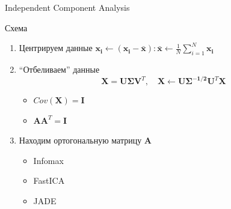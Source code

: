 \documentclass[10pt]{beamer}
\begin{document}
\begin{frame}{Independent Component Analysis}
\begin{block}{Схема}
    \begin{enumerate}
        \item Центрируем данные $\mathbf{x_i} \leftarrow (\mathbf{x_i} -
            \mathbf{\bar{x}}): \mathbf{\bar{x}} \leftarrow \frac{1}{N} \sum
            \limits _{i=1}^N \mathbf{x_i}$
        \item ``Отбеливаем'' данные
        \[
            \mathbf{X} = \mathbf{U} \mathbf{\Sigma} \mathbf{V}^T, \quad \mathbf{X}
            \leftarrow \mathbf{U} \mathbf{\Sigma^{-1/2}} \mathbf{U}^T \mathbf{X}
        \]
        \begin{itemize}
            \item $Cov(\mathbf{X}) = \mathbf{I}$
            \item $\mathbf{A} \mathbf{A}^T = \mathbf{I}$
        \end{itemize}
        \item Находим ортогональную матрицу $\mathbf{A}$
        \begin{itemize}
            \item Infomax
            \item FastICA
            \item JADE
        \end{itemize}
    \end{enumerate}
\end{block}
\end{frame}
\end{document}

